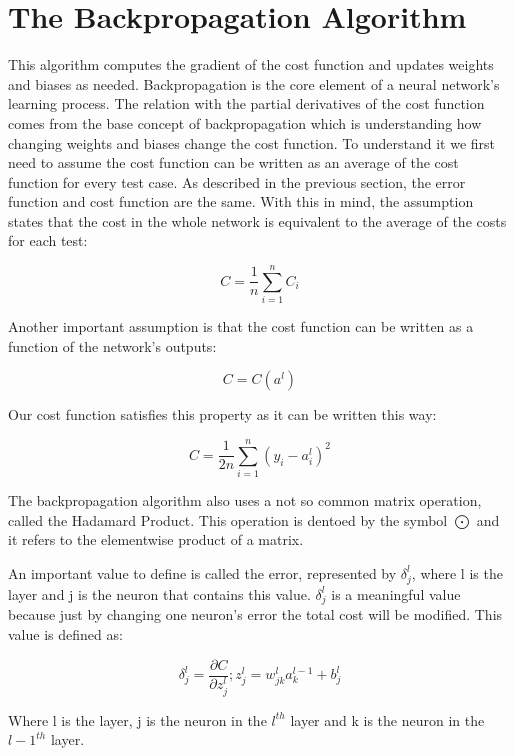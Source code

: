 \documentclass[a4paper, 12pt]{amsart}
\begin{document}
\section{The Backpropagation Algorithm}

This algorithm computes the gradient of the cost function and updates weights and biases as needed. Backpropagation is the core element of a neural network's learning process. The relation with the partial derivatives of the cost function comes from the base concept of backpropagation which is understanding how changing weights and biases change the cost function. To understand it we first need to assume the cost function can be written as an average of the cost function for every test case. As described in the previous section, the error function and cost function are the same. With this in mind, the assumption states that the cost in the whole network is equivalent to the average of the costs for each test:

\[C = \frac{1}{n}\sum_{i=1}^{n}C_i\]

Another important assumption is that the cost function can be written as a function of the network's outputs:

\[C = C(a^l)\]

Our cost function satisfies this property as it can be written this way:

\[C = \frac{1}{2n}\sum_{i=1}^{n} (y_i-a_i^l)^2\]

The backpropagation algorithm also uses a not so common matrix operation, called the Hadamard Product. This operation is dentoed by the symbol $\bigodot$ and it refers to the elementwise product of a matrix. 

An important value to define is called the error, represented by $\delta_j^l$, where l is the layer and j is the neuron that contains this value. $\delta_j^l$ is a meaningful value because just by changing one neuron's error the total cost will be modified. This value is defined as:

\[\delta_j^l = \frac{\partial C}{\partial z_j^l} ;  z^l_j = w_{jk}^la_k^{l-1}+b_j^l\]

Where l is the layer, j is the neuron in the $l^{th}$ layer and k is the neuron in the $l-1^{th}$ layer.
\end{document}
